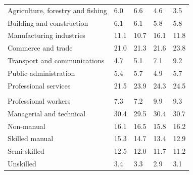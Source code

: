 \documentclass{article}
\begin{document}
\begin{table}[h]
\begin{tabular}{KTTTT}
    \hline
Agriculture, forestry and fishing  & 6.0& 6.6& 4.6& 3.5\\
Building and construction & 6.1& 6.1& 5.8& 5.8\\
Manufacturing industries & 11.1& 10.7& 16.1& 11.8\\
Commerce and trade  & 21.0& 21.3& 21.6& 23.8\\
Transport and communications  & 4.7& 5.1& 7.1& 9.2\\
Public administration & 5.4& 5.7& 4.9& 5.7\\
Professional services & 21.5& 23.9& 24.3& 24.5\\
\hline
    \\ 
    \hline
Professional workers  & 7.3& 7.2 & 9.9& 9.3\\
Managerial and technical & 30.4& 29.5& 30.4& 30.7\\
Non-manual & 16.1& 16.5& 15.8& 16.2\\
Skilled manual & 15.3& 14.7& 13.4& 12.9\\
Semi-skilled & 12.5& 12.0& 11.7& 11.2\\
Unskilled  & 3.4& 3.3& 2.9& 3.1\\
\end{tabular}
\end{table}
\pagebreak
\end{document}
